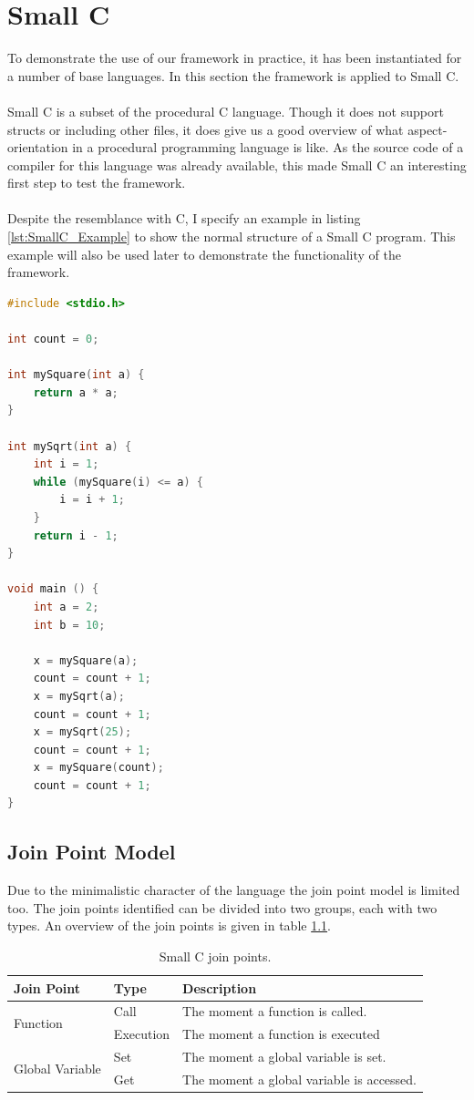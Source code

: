 \documentclass[a4paper]{report}
\begin{document}
\chapter{Small C}
\label{chap:SmallC}
To demonstrate the use of our framework in practice, it has been instantiated for a number of base languages. In this section the framework is applied to Small C.\\
\\
Small C is a subset of the procedural C language. Though it does not support structs or including other files, it does give us a good overview of what aspect-orientation in a procedural programming language is like. As the source code of a compiler for this language was already available, this made Small C an interesting first step to test the framework.\\
\\
Despite the resemblance with C, I specify an example in listing \ref{lst:SmallC_Example} to show the normal structure of a Small C program. This example will also be used later to demonstrate the functionality of the framework.
\begin{lstlisting}[language=C, multicols=2, caption=A simple Small C program., label=lst:SmallC_Example]
#include <stdio.h>

int count = 0;

int mySquare(int a) {
	return a * a;
}

int mySqrt(int a) {
	int i = 1;
	while (mySquare(i) <= a) {
		i = i + 1;
	}	
	return i - 1;
}

void main () {
	int a = 2;
	int b = 10;
	
	x = mySquare(a);
	count = count + 1;
	x = mySqrt(a);
	count = count + 1;
	x = mySqrt(25);
	count = count + 1;
	x = mySquare(count);
	count = count + 1;
}
\end{lstlisting}

\section{Join Point Model}
Due to the minimalistic character of the language the join point model is limited too. The join points identified can be divided into two groups, each with two types. An overview of the join points is given in table \ref{tab:SmallC_JoinPoints}.
\begin{table}[h!]
\centering
\begin{tabular}{|l|l|l|}
\hline
Join Point & Type & Description\\
\hline
\multirow{2}{*}{Function} & Call & The moment a function is called.\\
& Execution & The moment a function is executed\\
\hline
\multirow{2}{*}{Global Variable} & Set & The moment a global variable is set.\\
& Get & The moment a global variable is accessed.\\
\hline
\end{tabular}
\caption{Small C join points.}
\label{tab:SmallC_JoinPoints}
\end{table}
\end{document}
